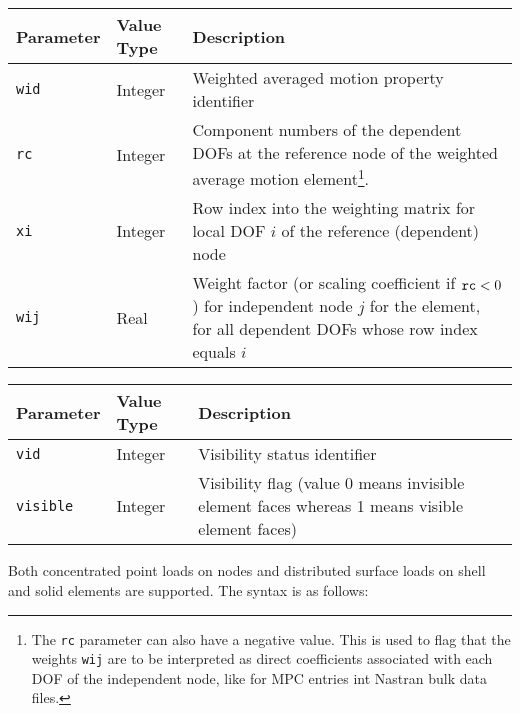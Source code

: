 \noindent
\begin{tabular}{| m{} | m{} | m{} |}
  \hline
  \rowcolor[HTML]{EFEFEF}
  Parameter & Value Type & Description \\
  \hline\hline
  {\tt wid} & Integer & Weighted averaged motion property identifier \\
  \hline
  {\tt rc}  & Integer & Component numbers of the dependent DOFs \newline
                        at the reference node of the weighted average motion
                        element\footnote{
                        The {\tt rc} parameter can also have a negative value.
                        This is used to flag that the weights {\tt wij} are to
                        be interpreted as direct coefficients associated with
                        each DOF of the independent node, like for MPC entries
                        int Nastran bulk data files.}. \\
  \hline
  {\tt xi}  & Integer & Row index into the weighting matrix for local DOF $i$
                        of the reference (dependent) node \\
  \hline
  {\tt wij} & Real & Weight factor (or scaling coefficient if ${\tt rc}<0$)
                     for independent node $j$ for the element,
                     for all dependent DOFs whose row index equals $i$ \\
  \hline
\end{tabular}


\noindent
\begin{tabular}{ | m{} | m{} | m{} |}
  \hline
  \rowcolor[HTML]{EFEFEF}
  Parameter     & Value Type & Description \\
  \hline\hline
  {\tt vid}     & Integer & Visibility status identifier \\
  \hline
  {\tt visible} & Integer & Visibility flag (value 0 means invisible element
                            faces whereas 1 means visible element faces) \\
  \hline
\end{tabular}

\clearpage



Both concentrated point loads on nodes and distributed surface loads on shell
and solid elements are supported. The  syntax is as follows:

